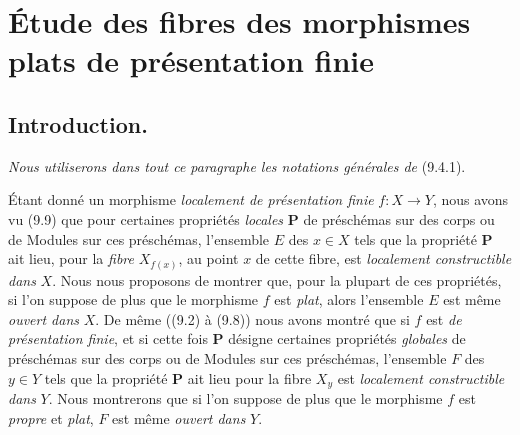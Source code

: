 \section{Étude des fibres des morphismes plats de présentation finie}
\label{section:IV.12-fr}

\setcounter{subsection}{-1}
\subsection{Introduction.}
\label{subsection:IV.12.0-fr}

\emph{Nous utiliserons dans tout ce paragraphe les notations générales de}
(9.4.1).

\begin{env}[12.0.1]
\label{IV.12.0.1-fr}
Étant donné un morphisme \emph{localement de présentation finie} $f:X\to Y$, nous
avons vu (9.9) que pour certaines propriétés \emph{locales} $\boldsymbol{P}$ de préschémas
sur des corps ou de Modules sur ces préschémas, l'ensemble $E$ des $x\in X$
tels que la propriété $\boldsymbol{P}$ ait lieu, pour la \emph{fibre} $X_{f(x)}$, au point
$x$ de cette fibre, est \emph{localement constructible dans} $X$. Nous nous proposons
de montrer que, pour la plupart de ces propriétés, si l'on suppose de plus que
le morphisme $f$ est \emph{plat}, alors l'ensemble $E$ est même \emph{ouvert dans} $X$. De
même ((9.2) à (9.8)) nous avons montré que si $f$ est \emph{de présentation finie},
et si cette fois $\boldsymbol{P}$ désigne certaines propriétés \emph{globales} de
préschémas sur des corps ou de Modules sur ces préschémas, l'ensemble $F$ des
$y\in Y$ tels que la propriété $\boldsymbol{P}$ ait lieu pour la fibre $X_y$ est
\emph{localement constructible dans} $Y$. Nous montrerons que si l'on suppose de plus
que le morphisme $f$ est \emph{propre} et \emph{plat}, $F$ est même \emph{ouvert dans} $Y$.
\end{env}

